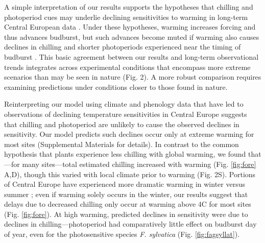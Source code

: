 \documentclass{article}
\begin{document}
\par A simple interpretation of our results supports the hypotheses that chilling and photoperiod cues may underlie declining sensitivities to warming in long-term Central European data \citep{Rutishauser:2008,yu2010,fu2015}. Under these hypotheses, warming increases forcing and thus advances budburst, but such advances become muted if warming also causes declines in chilling and shorter photoperiods experienced near the timing of budburst 
\citep{koerner2010a}. %
This basic agreement between our results and long-term observational trends integrates across experimental conditions that encompass more extreme scenarios than may be seen in nature (Fig. 2). A more robust comparison requires examining predictions under conditions closer to those found in nature.


\par Reinterpreting our model using climate and phenology data that have led to observations of declining temperature sensitivities in Central Europe suggests that chilling and photoperiod are unlikely to cause the observed declines in sensitivity. Our model predicts such declines occur only at extreme warming for most sites (Supplemental Materials for details). In contrast to the common hypothesis that plants experience less chilling with global warming, we found that---for many sites---total estimated chilling increased with warming (Fig. \ref{fig:fore} A,D), though this varied with local climate prior to warming (Fig. 2S). 
Portions of Central Europe have experienced more dramatic warming in winter versus summer \citep{balling1998}; even if warming solely occurs in the winter, our results suggest that delays due to decreased chilling only occur at warming above 4\degree C for most sites (Fig. \ref{fig:fore}). At high warming, predicted declines in sensitivity were due to declines in chilling---photoperiod had comparatively little effect on budburst day of year, even for the photosensitive species \emph{F. sylvatica} (Fig. \ref{fig:fagsyllat}). 
\end{document}
